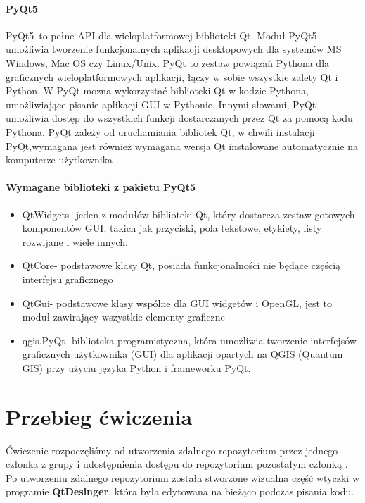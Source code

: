 \documentclass[a4paper,titleauthor]{mwart}
\begin{document}
    \paragraph{PyQt5}
    PyQt5--to pełne API dla wieloplatformowej biblioteki Qt. Moduł PyQt5 umożliwia tworzenie funkcjonalnych aplikacji desktopowych dla systemów MS Windows, Mac OS czy Linux/Unix. PyQt to zestaw powiązań Pythona dla graficznych wieloplatformowych aplikacji, łączy w sobie wszystkie zalety Qt i Python. W PyQt mozna wykorzystać biblioteki Qt w kodzie Pythona, umożliwiające pisanie aplikacji GUI w Pythonie. Innymi słowami, PyQt umożliwia dostęp do wszystkich funkcji dostarczanych przez Qt za pomocą kodu Pythona. PyQt zależy od uruchamiania bibliotek Qt, w chwili instalacji PyQt,wymagana jest również wymagana wersja Qt instalowane automatycznie na komputerze użytkownika .
    \begin{flushright}
        \cite{PyQt5}
    \end{flushright}

    
    \paragraph{Wymagane biblioteki z pakietu PyQt5}
    
    \begin{itemize}
        \item QtWidgets- jeden z modułów biblioteki Qt, który dostarcza zestaw gotowych komponentów GUI, takich jak przyciski, pola tekstowe, etykiety, listy rozwijane i wiele innych.

        \item QtCore- podstawowe klasy Qt, posiada funkcjonalności nie będące częścią interfejsu graficznego

        \item QtGui- podstawowe klasy wspólne dla GUI widgetów i OpenGL, jest to moduł zawirający wszystkie elementy graficzne
        
        \item qgis.PyQt- biblioteka programistyczna, która umożliwia tworzenie interfejsów graficznych użytkownika (GUI) dla aplikacji opartych na QGIS (Quantum GIS) przy użyciu języka Python i frameworku PyQt.
    \end{itemize}
    \begin{flushright}
        \cite{biblioteki}
    \end{flushright}



    \section{Przebieg ćwiczenia}
    Ćwiczenie rozpoczęliśmy od utworzenia zdalnego repozytorium przez jednego członka z grupy i udostępnienia dostępu do repozytorium pozostałym członką .\\
    Po utworzeniu zdalnego repozytorium została stworzone wizualna część wtyczki w programie \textbf{QtDesinger}, która była edytowana na bieżąco podczas pisania kodu. \\
\end{document}
